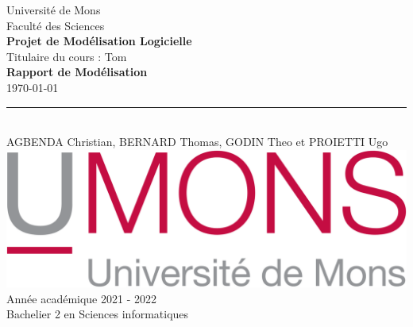 \documentclass[french, a4paper, 12pt]{article}
\begin{document}
\nocite{*}

\begin{titlepage}
\begin{center}

Université de Mons\\Faculté des Sciences \\ \vspace{5mm}
\textbf{Projet de Modélisation Logicielle} \\ \vspace{5mm}
Titulaire du cours : Tom  \\        \vspace{25mm}
\LARGE{\textbf{Rapport de Modélisation }\\            \vspace{2mm}
}
\small{\today}\\
\rule{10cm}{3pt}\\                           \vspace{10mm}
\LARGE{AGBENDA Christian, BERNARD Thomas, GODIN Theo et PROIETTI Ugo  \bsc{}  \bsc{} } \\
\vspace{50mm}
\includegraphics[scale=0.25]{UMons.png}\\
\vspace{20pt}
Année académique 2021 - 2022\\
Bachelier 2 en Sciences informatiques\\
\end{center}

\end{titlepage}
\end{document}
